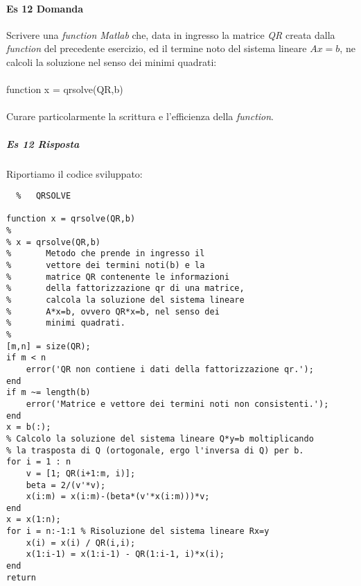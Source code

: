 \documentclass[a4paper]{report}
\begin{document}
\paragraph{Es 12 Domanda}
Scrivere una \emph{function Matlab} che, data in ingresso la matrice \emph{QR} creata dalla \emph{function} del precedente esercizio, ed il termine noto del sistema lineare $Ax = b$, ne calcoli la soluzione nel senso dei minimi quadrati:\\\\function x = qrsolve(QR,b)\\\\
Curare particolarmente la scrittura e l'efficienza della \emph{function}.
\subparagraph{Es 12 Risposta}
Riportiamo il codice sviluppato:\\
\begin{lstlisting}	%	QRSOLVE

function x = qrsolve(QR,b)
%
% x = qrsolve(QR,b)
%       Metodo che prende in ingresso il 
%       vettore dei termini noti(b) e la
%       matrice QR contenente le informazioni 
%       della fattorizzazione qr di una matrice, 
%       calcola la soluzione del sistema lineare
%       A*x=b, ovvero QR*x=b, nel senso dei
%       minimi quadrati.
%
[m,n] = size(QR);
if m < n
	error('QR non contiene i dati della fattorizzazione qr.');
end
if m ~= length(b)
	error('Matrice e vettore dei termini noti non consistenti.');
end
x = b(:);
% Calcolo la soluzione del sistema lineare Q*y=b moltiplicando
% la trasposta di Q (ortogonale, ergo l'inversa di Q) per b.
for i = 1 : n                                   
	v = [1; QR(i+1:m, i)];
	beta = 2/(v'*v);
	x(i:m) = x(i:m)-(beta*(v'*x(i:m)))*v;
end
x = x(1:n);
for i = n:-1:1 % Risoluzione del sistema lineare Rx=y 
	x(i) = x(i) / QR(i,i);
	x(1:i-1) = x(1:i-1) - QR(1:i-1, i)*x(i);
end
return
\end{lstlisting}
\newpage
\end{document}
